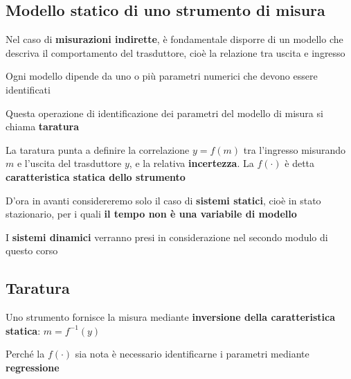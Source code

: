 \documentclass[
  letterpaper,
  DIV=11,
  numbers=noendperiod,
  oneside]{scrartcl}
\begin{document}

\subsection{Modello statico di uno strumento di
misura}\label{modello-statico-di-uno-strumento-di-misura}

Nel caso di \textbf{misurazioni indirette}, è fondamentale disporre di
un modello che descriva il comportamento del trasduttore, cioè la
relazione tra uscita e ingresso

Ogni modello dipende da uno o più parametri numerici che devono essere
identificati

Questa operazione di identificazione dei parametri del modello di misura
si chiama \textbf{taratura}

La taratura punta a definire la correlazione \(y=f(m)\) tra l'ingresso
misurando \(m\) e l'uscita del trasduttore \(y\), e la relativa
\textbf{incertezza}. La \(f(\cdot)\) è detta \textbf{caratteristica
statica dello strumento}

D'ora in avanti considereremo solo il caso di \textbf{sistemi statici},
cioè in stato stazionario, per i quali \textbf{il tempo non è una
variabile di modello}

I \textbf{sistemi dinamici} verranno presi in considerazione nel secondo
modulo di questo corso


\subsection{Taratura}\label{taratura}

Uno strumento fornisce la misura mediante \textbf{inversione della
caratteristica statica}: \(m=f^{-1}(y)\)

Perché la \(f(\cdot)\) sia nota è necessario identificarne i parametri
mediante \textbf{regressione}
\end{document}
